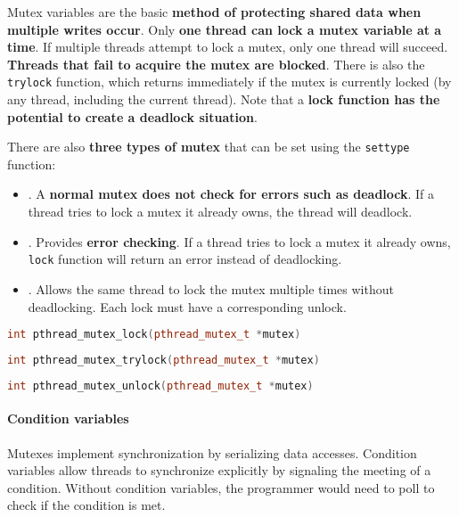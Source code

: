 Mutex variables are the basic \textbf{method of protecting shared data when multiple writes occur}. Only \textbf{one thread can lock a mutex variable at a time}. If multiple threads attempt to lock a mutex, only one thread will succeed. \textbf{Threads that fail to acquire the mutex are blocked}. There is also the \texttt{trylock} function, which returns immediately if the mutex is currently locked (by any thread, including the current thread). Note that a \textbf{lock function has the potential to create a deadlock situation}.

\highspace
There are also \textbf{three types of mutex} that can be set using the \texttt{settype} function:
\begin{itemize}
    \item {}. A \textbf{normal mutex does not check for errors such as deadlock}. If a thread tries to lock a mutex it already owns, the thread will deadlock.
    \item {}. Provides \textbf{error checking}. If a thread tries to lock a mutex it already owns, \texttt{lock} function will return an error instead of deadlocking.
    \item {}. Allows the same thread to lock the mutex multiple times without deadlocking. Each lock must have a corresponding unlock.
\end{itemize}
\begin{pthreadbox}
    \begin{lstlisting}[language=c++]
int pthread_mutex_lock(pthread_mutex_t *mutex)\end{lstlisting}
\end{pthreadbox}
\begin{pthreadbox}
    \begin{lstlisting}[language=c++]
int pthread_mutex_trylock(pthread_mutex_t *mutex)\end{lstlisting}
\end{pthreadbox}
\begin{pthreadbox}
    \begin{lstlisting}[language=c++]
int pthread_mutex_unlock(pthread_mutex_t *mutex)\end{lstlisting}
\end{pthreadbox}

\longline

\paragraph{Condition variables}\label{paragraph: Condition variables}

Mutexes implement synchronization by serializing data accesses. Condition variables allow threads to synchronize explicitly by signaling the meeting of a condition. Without condition variables, the programmer would need to poll to check if the condition is met.